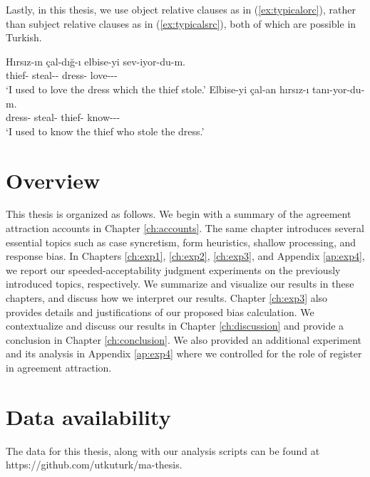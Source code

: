 Lastly, in this thesis, we use object relative clauses as in (\ref{ex:typicalorc}), rather than subject relative clauses as in (\ref{ex:typicalsrc}), both of which are possible in Turkish. 

\ea \label{ex:srcandorc}
  \ea \label{ex:typicalorc}
    \gll H{\i}rs{\i}z-{\i}n \c{c}al-d{\i}\u{g}-{\i} elbise-yi sev-iyor-du-m.\\
    thief-\Gen{} steal-\Nmlz-\Poss{} dress-\Acc{} love-\Impf-\Pst-\Fsg{}\\
    \glt `I used to love the dress which the thief stole.'
  \ex \label{ex:typicalsrc}
    \gll Elbise-yi \c{c}al-an h{\i}rs{\i}z-{\i} tan{\i}-yor-du-m.\\
    dress-\Acc{} steal-\Nmlz{} thief-\Acc{} know-\Impf-\Pst-\Fsg{}\\
    \glt `I used to know the thief who stole the dress.'
  \z
\z

\section{Overview}

This thesis is organized as follows. We begin with a summary of the agreement attraction accounts in Chapter \ref{ch:accounts}. The same chapter introduces several essential topics such as case syncretism, form heuristics, shallow processing, and response bias. In Chapters \ref{ch:exp1}, \ref{ch:exp2}, \ref{ch:exp3}, and Appendix \ref{ap:exp4}, we report our speeded-acceptability judgment experiments on the previously introduced topics, respectively. We summarize and visualize our results in these chapters, and discuss how we interpret our results. Chapter \ref{ch:exp3} also provides details and justifications of our proposed bias calculation. We contextualize and discuss our results in Chapter \ref{ch:discussion} and provide a conclusion in Chapter \ref{ch:conclusion}. We also provided an additional experiment and its analysis in Appendix \ref{ap:exp4} where we controlled for the role of register in agreement attraction.

\section{Data availability}

The data for this thesis, along with our analysis scripts can be found at https://github.com/utkuturk/ma-thesis.